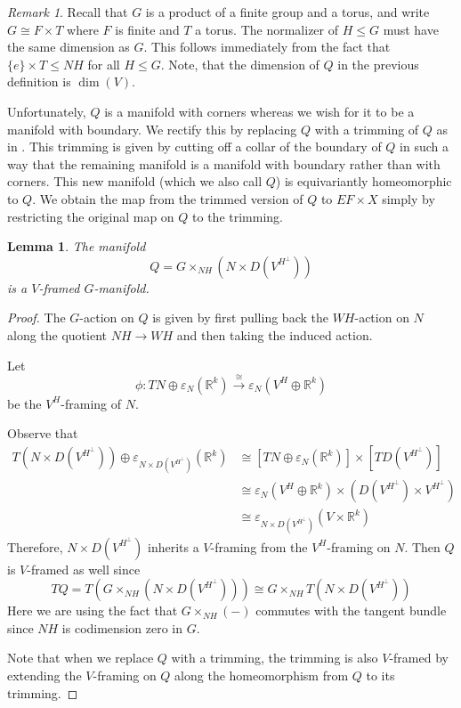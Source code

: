 \documentclass[11pt]{amsart}
\newcommand{\R}{\mathbb R}
\theoremstyle{plain}   %
\newtheorem{lem}[thm]{Lemma}
\theoremstyle{definition}
\theoremstyle{remark}
\newtheorem{rmk}[thm]{Remark}
\numberwithin{equation}{section}
\begin{document}
\begin{rmk}
Recall that $G$ is a product of a finite group and a torus, and write $G\cong F\times T$ where $F$ is finite and $T$ a torus. The normalizer of $H\leq G$ must have the same dimension as $G$. This follows immediately from the fact that $\{e\}\times T\leq NH$ for all $H\leq G$. Note, that the dimension of $Q$ in the previous definition is $\dim (V)$. 
\end{rmk}

Unfortunately, $Q$ is a manifold with corners whereas we wish for it to be a manifold with boundary. We rectify this by replacing $Q$ with a trimming of $Q$ as in \cite[2.22]{gimm}. This trimming is given by cutting off a collar of the boundary of $Q$ in such a way that the remaining manifold is a manifold with boundary rather than with corners. This new manifold (which we also call $Q$) is equivariantly homeomorphic to $Q$. We obtain the map from the trimmed version of $Q$ to $EF\times X$ simply by restricting the original map on $Q$ to the trimming. 

\begin{lem}
The manifold 
\[
Q = G\times_{NH}(N\times D(V^{H^\perp}))
\]
is a $V$-framed $G$-manifold.
\end{lem}
\begin{proof}
The $G$-action on $Q$ is given by first pulling back the $WH$-action on $N$ along the quotient $NH\rightarrow WH$ and then taking the induced action.

Let
\[
\phi:TN\oplus\varepsilon_N(\R^k)\xrightarrow{\cong} \varepsilon_N(V^H\oplus\R^k)
\]
be the $V^H$-framing of $N$.

Observe that
\begin{align*}
T(N\times D(V^{H^\perp})) \oplus \varepsilon_{N\times D(V^{H^\perp})}(\R^k)
& \cong [TN \oplus \varepsilon_N(\R^k)]\times[TD(V^{H^\perp})]\\
& \cong \varepsilon_N(V^H\oplus \R^k)\times (D(V^{H^\perp})\times V^{H^\perp})\\
& \cong \varepsilon_{N\times D(V^{H^\perp})}(V\times \R^k)
\end{align*}
Therefore, $N\times D(V^{H^\perp})$ inherits a $V$-framing from the $V^H$-framing on $N$. Then $Q$ is $V$-framed as well since 
\[
TQ = T(G\times_{NH}(N\times D(V^{H^\perp})))\cong G\times_{NH} T(N\times D(V^{H^\perp}))
\]
Here we are using the fact that $G\times_{NH}(-)$ commutes with the tangent bundle since $NH$ is codimension zero in $G$. 

Note that when we replace $Q$ with a trimming, the trimming is also $V$-framed  by extending the $V$-framing on $Q$ along the homeomorphism from $Q$ to its trimming. 
\end{proof}
\end{document}
